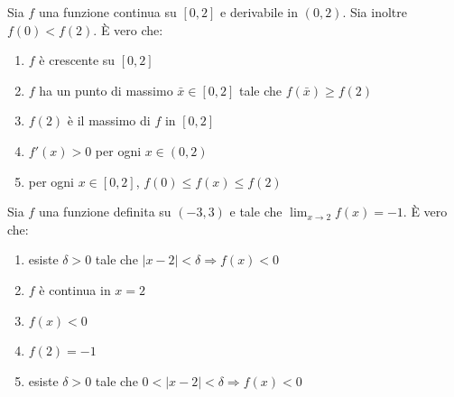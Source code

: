 \begin{quiz}
Sia $f$ una funzione continua su $[0,2]$ e derivabile in $(0,2)$. Sia inoltre $f(0)<f(2)$. È vero che:
\begin{enumerate}[label=\alph*),leftmargin=1.3cm,itemsep=3pt,topsep=5pt]\item $f$ \`e crescente su $[0,2]$\item $f$ ha un punto di massimo $\bar x\in[0,2]$ tale che $f(\bar x)\ge f(2)$\item $f(2)$ \`e il massimo di $f$ in $[0,2]$\item $f'(x)>0$ per ogni $x\in(0,2)$\item per ogni $x\in[0,2]$, $f(0)\le f(x)\le f(2)$\end{enumerate}
\end{quiz}

\begin{quiz}
Sia $f$ una funzione definita su $(-3,3)$ e tale che $\lim_{x\to2}f(x)=-1$. È vero che:
\begin{enumerate}[label=\alph*),leftmargin=1.3cm,itemsep=3pt,topsep=5pt]\item esiste $\delta>0$ tale che $|x-2|<\delta\Rightarrow f(x)<0$\item $f$ \`e continua in $x=2$\item $f(x)<0$\item $f(2)=-1$\item esiste $\delta>0$ tale che $0<|x-2|<\delta\Rightarrow f(x)<0$\end{enumerate}
\end{quiz}

